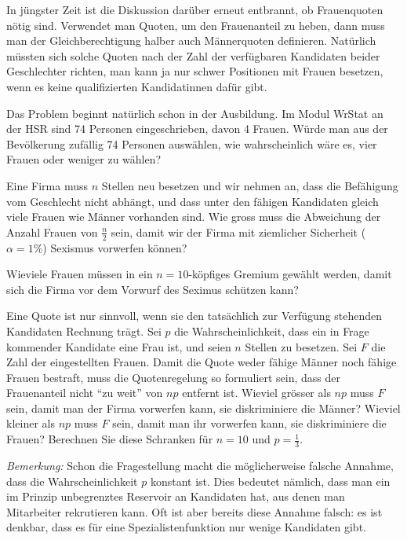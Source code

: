 In jüngster Zeit ist die Diskussion darüber erneut entbrannt,
ob Frauenquoten nötig sind. Verwendet man Quoten, um den Frauenanteil
zu heben, dann muss man der Gleichberechtigung halber auch Männerquoten
definieren. Natürlich müssten sich solche Quoten nach der Zahl der
verfügbaren Kandidaten beider Geschlechter richten, man kann ja nur
schwer Positionen mit Frauen besetzen, wenn es keine qualifizierten
Kandidatinnen dafür gibt.
\begin{teilaufgaben}
\item Das Problem beginnt natürlich schon in der Ausbildung. Im Modul
WrStat an der HSR sind 74 Personen eingeschrieben, davon 4 Frauen.
Würde man aus
der Bevölkerung zufällig 74 Personen auswählen, wie wahrscheinlich
wäre es, vier Frauen oder weniger zu wählen?
\item Eine Firma muss $n$ Stellen neu besetzen und wir nehmen an, dass die
Befähigung vom Geschlecht nicht abhängt,
und dass unter den fähigen Kandidaten gleich viele Frauen wie Männer
vorhanden sind. Wie gross muss die Abweichung der Anzahl Frauen von
$\frac{n}2$ sein, damit wir der Firma mit ziemlicher Sicherheit ($\alpha=1\%$)
Sexismus vorwerfen können?
\item
Wieviele Frauen müssen in ein $n=10$-köpfiges
Gremium gewählt werden, damit sich die Firma vor dem Vorwurf des
Seximus schützen kann?
\item Eine Quote ist nur sinnvoll, wenn sie den tatsächlich zur
Verfügung stehenden Kandidaten Rechnung trägt.
Sei $p$ die Wahrscheinlichkeit, dass ein in Frage kommender Kandidate
eine Frau ist, und seien $n$ Stellen zu besetzen. Sei $F$ die
Zahl der eingestellten Frauen.
Damit die Quote weder fähige Männer noch fähige Frauen bestraft,
muss die Quotenregelung so formuliert sein, dass der Frauenanteil nicht
``zu weit'' von $np$ entfernt ist. Wieviel grösser als $np$ muss $F$
sein, damit man der Firma vorwerfen kann, sie diskriminiere die Männer?
Wieviel kleiner als $np$ muss $F$  sein, damit man ihr vorwerfen kann,
sie diskriminiere die Frauen? Berechnen Sie diese Schranken für
$n=10$ und $p=\frac13$.
\end{teilaufgaben}
{\it Bemerkung:} Schon die Fragestellung macht die möglicherweise falsche
Annahme, dass die Wahrscheinlichkeit
$p$ konstant ist. Dies bedeutet nämlich, dass man ein im Prinzip
unbegrenztes Reservoir an Kandidaten hat, aus denen man Mitarbeiter
rekrutieren kann. Oft ist aber bereits diese Annahme falsch: es ist
denkbar, dass es für eine Spezialistenfunktion nur wenige Kandidaten
gibt.

